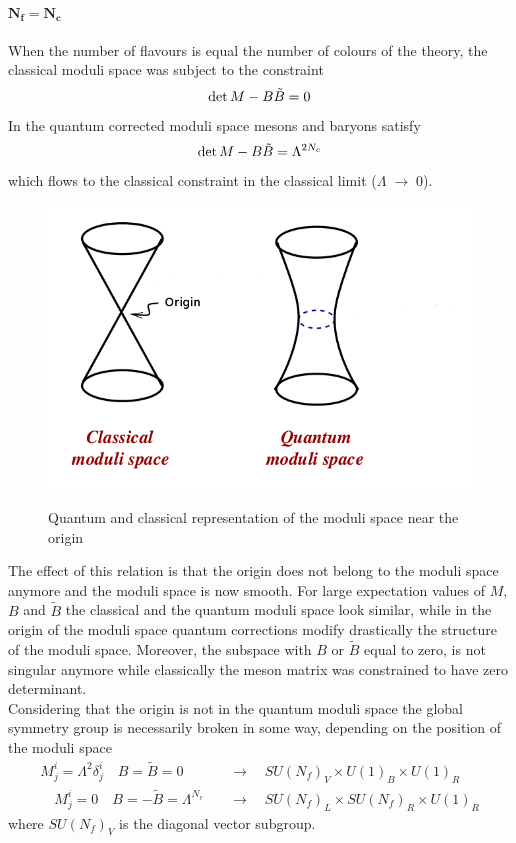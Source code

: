 \paragraph{$\mathbf{ N_f = N_c}$}
When the number of flavours is equal the number of colours of the theory, the classical moduli space was subject to the constraint
\begin{equation}
 \mathrm{det } \,{M} - B \tilde{B} = 0
\end{equation}
In the quantum corrected moduli space mesons and baryons satisfy \cite{Seiberg:1994bz}
\begin{equation}
 \mathrm{det } \,{M} - B \tilde{B} = \Lambda^{2 N_c}
\end{equation}
which flows to the classical constraint in the classical limit ($\Lambda \; \rightarrow \;0$).
\\
\begin{figure}
\centering
{\includegraphics[width=5 cm]{quantum_moduli_space_sqcd.png} }
{\caption{ Quantum and classical representation of the moduli space near the origin}}
\end{figure}
The effect of this relation is that the origin  does not belong to the moduli space anymore and the moduli space is now smooth.
For large expectation values of $M$, $B$ and $\tilde{B}$ the classical and the quantum moduli space look similar, while in the origin of the moduli space quantum corrections modify drastically the structure of the moduli space.
Moreover, the subspace with $B$ or $\tilde{B}$ equal to zero, is not singular anymore while classically the meson matrix was constrained to have zero determinant. 
\\
Considering that the origin is not in the quantum moduli space the global symmetry group is necessarily broken in some way, depending on the position of the moduli space 
\begin{align}
M^i_j = \Lambda^2 \delta^i_j \quad B=\tilde{B}= 0 \quad & \rightarrow  \quad SU(N_f)_V \times U(1)_B \times U(1)_R\\
\quad M^i_j = 0 \quad B=-\tilde{B}= \Lambda^{N_c} \quad & \rightarrow  \quad SU(N_f)_L \times SU(N_f)_R \times U(1)_R
\end{align}
where $SU(N_f)_V$ is the diagonal vector subgroup.
\\
